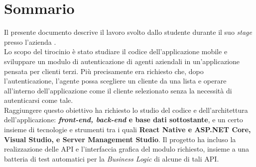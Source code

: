 \cleardoublepage
{}
{}
\begingroup
\let\clearpage\relax
\let\cleardoublepage\relax
\chapter*{Sommario}

Il presente documento descrive il lavoro svolto dallo studente {\myName} durante il suo \textit{stage} presso l’azienda {\companyLong}.\\
Lo scopo del tirocinio è stato studiare il codice dell’applicazione mobile {\movi} e sviluppare un modulo di autenticazione di agenti aziendali 
in un'applicazione pensata per clienti terzi. Più precisamente era richiesto che, dopo l’autenticazione, l’agente possa scegliere un cliente da una 
lista e operare all’interno dell’applicazione come il cliente selezionato senza la necessità di autenticarsi come tale.\\
Raggiungere questo obiettivo ha richiesto lo studio del codice e dell’architettura dell’applicazione: \textbf{\textit{front-end, back-end} e base dati 
sottostante}, e un certo insieme di tecnologie e strumenti tra i quali \textbf{React Native e ASP.NET Core, Visual Studio, e Server Management Studio}. 
Il progetto ha incluso la realizzazione delle API e l’interfaccia grafica del modulo richiesto, insieme a una batteria di test automatici per la 
\textit{Business Logic} di alcune di tali API.\\\\

